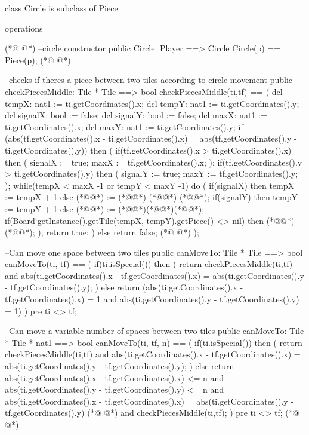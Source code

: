 \begin{vdmpp}[breaklines=true]
class Circle is subclass of Piece

operations
  
(*@
\label{Circle:5}
@*)
  --circle constructor
  public Circle: Player ==> Circle
  Circle(p) == Piece(p);
(*@
\label{checkPiecesMiddle:8}
@*)

  --checks if theres a piece between two tiles according to circle movement
  public checkPiecesMiddle: Tile * Tile ==> bool
  checkPiecesMiddle(ti,tf) == (
    dcl tempX: nat1 := ti.getCoordinates().x;
    dcl tempY: nat1 := ti.getCoordinates().y;
    dcl signalX: bool := false;
    dcl signalY: bool := false;
    dcl maxX: nat1 := ti.getCoordinates().x;
    dcl maxY: nat1 := ti.getCoordinates().y;
    if (abs(tf.getCoordinates().x - ti.getCoordinates().x) = abs(tf.getCoordinates().y - ti.getCoordinates().y)) then (
     if(tf.getCoordinates().x > ti.getCoordinates().x)
      then (
       signalX := true;
       maxX := tf.getCoordinates().x;
      );
     if(tf.getCoordinates().y > ti.getCoordinates().y)
      then (
       signalY := true;
       maxY := tf.getCoordinates().y;
      );
     while(tempX < maxX -1 or tempY < maxY -1)
       do (
         if(signalX)
          then tempX := tempX + 1
         else (*@@*) := (*@@*) (*@\vdmnotcovered{-}@*) (*@@*);
         if(signalY)
          then tempY := tempY + 1
         else
          (*@@*) := (*@@*)(*@\vdmnotcovered{-}@*)(*@@*);
         if(Board`getInstance().getTile(tempX, tempY).getPiece() <> nil)
          then (*@@*) (*@@*);
         );
     return true;
    )
    else return false;
(*@
\label{canMoveTo:44}
@*)
  );
  
  --Can move one space between two tiles
  public canMoveTo: Tile * Tile ==> bool
  canMoveTo(ti, tf) == (
   if(ti.isSpecial())
    then (
     return checkPiecesMiddle(ti,tf) and
         abs(ti.getCoordinates().x - tf.getCoordinates().x) = abs(ti.getCoordinates().y - tf.getCoordinates().y);
    )
   else return (abs(ti.getCoordinates().x - tf.getCoordinates().x) = 1 and
        abs(ti.getCoordinates().y - tf.getCoordinates().y) = 1)
  )
  pre ti <> tf;
  
  --Can move a variable number of spaces between two tiles
  public canMoveTo: Tile * Tile * nat1 ==> bool
  canMoveTo(ti, tf, n) == (
    if(ti.isSpecial())
     then (
      return checkPiecesMiddle(ti,tf) and
          abs(ti.getCoordinates().x - tf.getCoordinates().x) = abs(ti.getCoordinates().y - tf.getCoordinates().y);
     )
    else return abs(ti.getCoordinates().x - tf.getCoordinates().x) <= n and
          abs(ti.getCoordinates().y - tf.getCoordinates().y) <= n and
          abs(ti.getCoordinates().x - tf.getCoordinates().x) = abs(ti.getCoordinates().y - tf.getCoordinates().y)
(*@
\label{getSize:70}
@*)
           and checkPiecesMiddle(ti,tf);
  )
  pre ti <> tf;
(*@
\label{getTopPiece:73}
@*)
  

\end{vdmpp}
